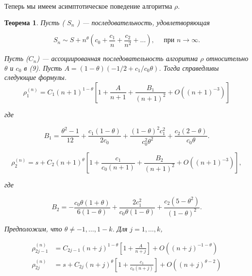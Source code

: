 \documentclass[14pt, a4paper]{extarticle}
\newtheorem{theorem}{Теорема}[section] %
\theoremstyle{definition}
\theoremstyle{remark}
\begin{document}
Теперь мы имеем асимптотическое поведение алгоритма $\rho$.\\
\begin{theorem}
    
 Пусть ( $S_{n}$ ) — последовательность, удовлетворяющая


\begin{equation}
S_{n} \sim S+n^{\theta}\left(c_{0}+\frac{c_{1}}{n}+\frac{c_{2}}{n^{2}}+\ldots\right), \quad \text { при } n \rightarrow \infty .
\end{equation}


Пусть ($C_{n}$) — ассоциированная последовательность алгоритма $\rho$ относительно $\theta$ и $c_{0}$ в (9). Пусть $A=(1-\theta)\left(-1 / 2+c_{1} / c_{0} \theta\right)$. Тогда справедливы следующие формулы.\\

\begin{equation}
\rho_{1}^{(n)}=C_{1}(n+1)^{1-\theta}\left[1+\frac{A}{n+1}+\frac{B_{1}}{(n+1)^{2}}+O\left((n+1)^{-3}\right)\right]
\end{equation}


где


\begin{equation}
B_{1}=\frac{\theta^{2}-1}{12}+\frac{c_{1}(1-\theta)}{2 c_{0}}+\frac{(1-\theta)^{2} c_{1}^{2}}{c_{0}^ {2} \theta^{2}}+\frac{c_{2}(2-\theta)}{c_{0} \theta} .
\end{equation}


\begin{equation}
\rho_{2}^{(n)}=s+C_{2}(n+1)^{\theta}\left[1+\frac{c_{1}}{c_{0}(n+1)}+\frac{B_{2}}{(n+1)^{2}}+O\left((n+1)^{-3}\right)\right],
\end{equation}

где

\begin{equation}
B_{2}=-\frac{c_{0} \theta(1+\theta)}{6(1-\theta)}+\frac{2 c_{1}^{2}}{c_{0} \theta(1-\theta)}+\frac{c_{2}\left(5-\theta^{2}\right)}{(1-\theta)^{2}} .
\end{equation}


Предположим, что $\theta \neq-1, \ldots, 1-k$. Для $j=1, \ldots, k$,

\begin{subequations}
    
\begin{align}
\rho_{2 j-1}^{(n)} & =C_{2 j-1}(n+j)^{1-\theta}\left[1+\frac{A}{n+j}\right]+O\left((n+j)^{-1-\theta}\right)  \\
\rho_{2 j}^{(n)} & =s+C_{2 j}(n+j)^{\theta}\left[1+\frac{c_{1}}{c_{0}(n+j)}\right]+O\left((n+j)^{\theta-2}\right) 
\end{align}
\end{subequations}



\end{theorem}
\end{document}
